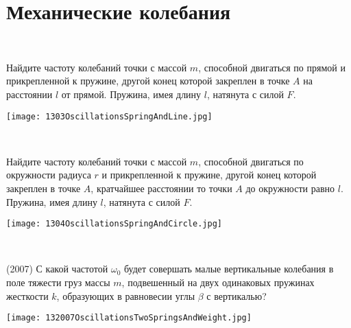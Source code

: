 \section{Механические колебания}


\begin{ex}
\hspace{0pt} \\
\begin{minipage}{.65\textwidth}
Найдите частоту колебаний точки с массой $m$, способной двигаться по прямой и прикрепленной к пружине, другой конец которой закреплен в точке $A$ на расстоянии $l$ от прямой. Пружина, имея длину $l$, натянута с силой $F$.
\end{minipage}
\begin{minipage}{.35\textwidth}
\centering
\texttt{[image: 1303OscillationsSpringAndLine.jpg]}
\end{minipage}
\begin{ans}
\end{ans}
\end{ex}

\begin{ex}
\hspace{0pt} \\
\begin{minipage}{.65\textwidth}
Найдите частоту колебаний точки с массой $m$, способной двигаться по окружности радиуса $r$ и прикрепленной к пружине, другой конец которой закреплен в точке $A$, кратчайшее расстоянии то точки $A$ до окружности равно $l$. Пружина, имея длину $l$, натянута с силой $F$.
\end{minipage}
\begin{minipage}{.35\textwidth}
\centering
\texttt{[image: 1304OscillationsSpringAndCircle.jpg]}
\end{minipage}
\begin{ans}
\end{ans}
\end{ex}

\begin{ex}
\hspace{0pt} \\
\begin{minipage}{.65\textwidth} 
(2007) С какой частотой $\omega_0$ будет совершать малые вертикальные колебания в поле тяжести груз массы $m$, подвешенный на двух одинаковых пружинах жесткости $k$, образующих в равновесии углы $\beta$ с вертикалью?
\end{minipage}
\begin{minipage}{.35\textwidth}
\centering
\texttt{[image: 132007OscillationsTwoSpringsAndWeight.jpg]}
\end{minipage}
\begin{ans}
\end{ans}
\end{ex}

